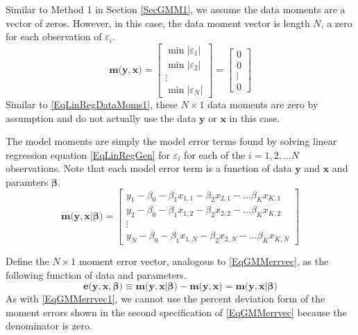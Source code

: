 \documentclass[letterpaper,12pt]{article}
\theoremstyle{definition}
\newcommand\ve{\varepsilon}
\newcommand\abs[1]{\left\lvert#1\right\rvert}
\begin{document}
    Similar to Method 1 in Section \ref{SecGMM1}, we assume the data moments are a vector of zeros. However, in this case, the data moment vector is length $N$, a zero for each observation of $\ve_i$.
    \begin{equation}\label{EqLinRegDataMoms2}
      \bm{m}\bigl(\bm{y},\bm{x}\bigr) =
        \begin{bmatrix}
          \min\abs{\ve_1} \\ \min\abs{\ve_2} \\ \vdots \\ \min\abs{\ve_N}
        \end{bmatrix} =
        \begin{bmatrix} 0 \\ 0 \\ \vdots \\ 0
        \end{bmatrix}
    \end{equation}
    Similar to \eqref{EqLinRegDataMoms1}, these $N\times 1$ data moments are zero by assumption and do not actually use the data $\bm{y}$ or $\bm{x}$ in this case.

    The model moments are simply the model error terms found by solving linear regression equation \eqref{EqLinRegGen} for $\ve_i$ for each of the $i=1,2,...N$ observations. Note that each model error term is a function of data $\bm{y}$ and $\bm{x}$ and paramters $\bm{\beta}$.
    \begin{equation}\label{EqLinRegModelMoms2}
      \bm{m}\bigl(\bm{y},\bm{x}|\bm{\beta}\bigr) =
        \begin{bmatrix}
          y_1 - \beta_0 - \beta_1 x_{1,1} - \beta_2 x_{2,1} - ... \beta_K x_{K,1} \\
          y_2 - \beta_0 - \beta_1 x_{1,2} - \beta_2 x_{2,2} - ... \beta_K x_{K,2} \\ \vdots \\
          y_N - \beta_0 - \beta_1 x_{1,N} - \beta_2 x_{2,N} - ... \beta_K x_{K,N}
        \end{bmatrix}
    \end{equation}

    Define the $N\times 1$ moment error vector, analogous to \eqref{EqGMMerrvec}, as the following function of data and parameters.
    \begin{equation}\label{EqGMMerrvec2}
      \bm{e}\bigl(\bm{y},\bm{x},\bm{\beta}\bigr)\equiv \bm{m}\bigl(\bm{y},\bm{x}|\bm{\beta}\bigr) - \bm{m}\bigl(\bm{y},\bm{x}\bigr) = \bm{m}\bigl(\bm{y},\bm{x}|\bm{\beta}\bigr)
    \end{equation}
    As with \eqref{EqGMMerrvec1}, we cannot use the percent deviation form of the moment errors shown in the second specification of \eqref{EqGMMerrvec} because the denominator is zero.
\end{document}
